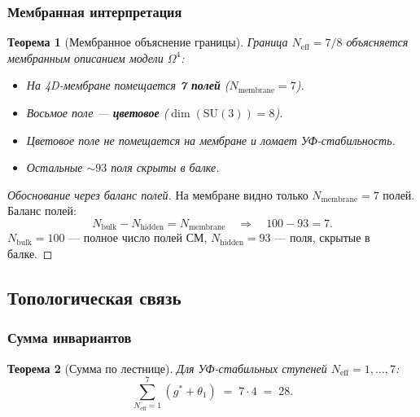 \documentclass[11pt,a4paper]{article}
\newcommand{\SU}{\ensuremath{\mathrm{SU}}}
\newcommand{\Om}{\ensuremath{\Omega^4}}
\newtheorem{theorem}{Теорема}[section]
\theoremstyle{definition}
\begin{document}
\subsubsection{Мембранная интерпретация}

\begin{theorem}[Мембранное объяснение границы]
\label{thm:membrane-explanation}
Граница $N_{\text{eff}} = 7/8$ объясняется мембранным описанием
модели $\Om$:
\begin{itemize}
    \item На 4D-мембране помещается \textbf{7 полей} ($N_{\text{membrane}} = 7$).
    \item Восьмое поле --- \textbf{цветовое} ($\dim(\SU(3)) = 8$).
    \item Цветовое поле \emph{не помещается} на мембране и ломает
          УФ-стабильность.
    \item Остальные $\sim 93$ поля скрыты в балке.
\end{itemize}
\end{theorem}

\begin{proof}[Обоснование через баланс полей]
На мембране видно только $N_{\text{membrane}} = 7$ полей.
Баланс полей:
\begin{equation}
    N_{\text{bulk}} - N_{\text{hidden}} = N_{\text{membrane}}
    \quad\Longrightarrow\quad
    100 - 93 = 7.
\end{equation}
$N_{\text{bulk}} = 100$ --- полное число полей СМ,
$N_{\text{hidden}} = 93$ --- поля, скрытые в балке.
\end{proof}

\subsection{Топологическая связь}
\label{subsec:frg-topology}

\subsubsection{Сумма инвариантов}

\begin{theorem}[Сумма по лестнице]
\label{thm:sum-28}
Для УФ-стабильных ступеней $N_{\text{eff}} = 1, \ldots, 7$:
\begin{equation}
    \boxed{
    \sum_{N_{\text{eff}} = 1}^{7} (g^* + \theta_1) \;=\; 7 \cdot 4 \;=\; 28.
    }
    \label{eq:sum-28-main}
\end{equation}
\end{theorem}
\end{document}
